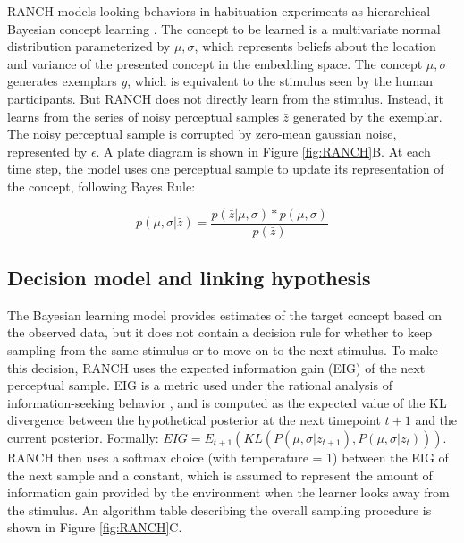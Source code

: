 \documentclass[
]{article}
\begin{document}
RANCH models looking behaviors in habituation experiments as hierarchical Bayesian concept learning \autocite{goodman2008rational,tenenbaum1999bayesian}. 
The concept to be learned is a multivariate normal distribution parameterized by \(\mu,\sigma\), which represents beliefs about the location and variance of the presented concept in the embedding space. The concept \(\mu,\sigma\) generates exemplars \(y\), which is equivalent to the stimulus seen by the human participants. But RANCH does not directly learn from the stimulus. Instead, it learns from the series of noisy perceptual samples \(\bar{z}\) generated by the exemplar. The noisy perceptual sample is corrupted by zero-mean gaussian noise, represented by \(\epsilon\). A plate diagram is shown in Figure \ref{fig:RANCH}B. At each time step, the model uses one perceptual sample to update its representation of the concept, following Bayes Rule:

\[p(\mu, \sigma | \bar{z}) = \frac{p(\bar{z} | \mu, \sigma) * p(\mu, \sigma)}{p(\bar{z})}\]

\hypertarget{decision-model-and-linking-hypothesis}{%
\subsection{Decision model and linking hypothesis}\label{decision-model-and-linking-hypothesis}}

The Bayesian learning model provides estimates of the target concept based on the observed data, but it does not contain a decision rule for whether to keep sampling from the same stimulus or to move on to the next stimulus. To make this decision, RANCH uses the expected information gain (EIG) of the next perceptual sample. EIG is a metric used under the rational analysis of information-seeking behavior \autocite{anderson1991human,oaksford1994rational}, and is computed as the expected value of the KL divergence between the hypothetical posterior at the next timepoint \(t+1\) and the current posterior. Formally: \(EIG = {E_{t+1}}(KL(P(\mu,\sigma|z_{t+1}), P(\mu,\sigma|z_{t})))\). RANCH then uses a softmax choice (with temperature = 1) between the EIG of the next sample and a constant, which is assumed to represent the amount of information gain provided by the environment when the learner looks away from the stimulus. An algorithm table describing the overall sampling procedure is shown in Figure \ref{fig:RANCH}C.
\end{document}
